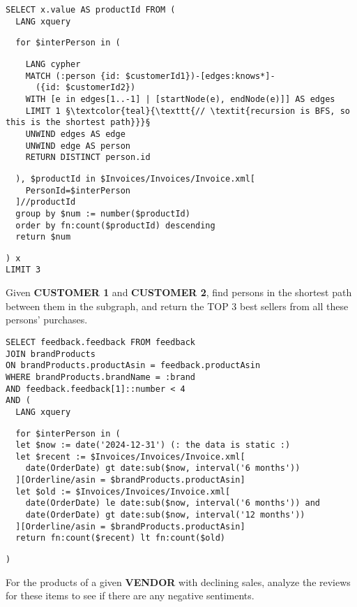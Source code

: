 \begin{listing}[!ht]
\begin{verbatim}
SELECT x.value AS productId FROM (
  LANG xquery
\end{verbatim}
\nestedMintedVspace
\begin{verbatim}
  for $interPerson in (
\end{verbatim}
\nestedMintedVspace
\begin{verbatim}
    LANG cypher
    MATCH (:person {id: $customerId1})-[edges:knows*]-
      ({id: $customerId2})
    WITH [e in edges[1..-1] | [startNode(e), endNode(e)]] AS edges
    LIMIT 1 §\textcolor{teal}{\texttt{// \textit{recursion is BFS, so this is the shortest path}}}§
    UNWIND edges AS edge
    UNWIND edge AS person
    RETURN DISTINCT person.id
\end{verbatim}
\nestedMintedVspace
\begin{verbatim}
  ), $productId in $Invoices/Invoices/Invoice.xml[
    PersonId=$interPerson
  ]//productId
  group by $num := number($productId)
  order by fn:count($productId) descending
  return $num
\end{verbatim}
\nestedMintedVspace
\begin{verbatim}
) x
LIMIT 3
\end{verbatim}
\caption{Given \textbf{CUSTOMER 1} and \textbf{CUSTOMER 2}, find persons in the shortest path between them in the subgraph, and return the TOP 3 best sellers from all these persons’ purchases.}
\end{listing}

\begin{listing}[!ht]
\begin{verbatim}
SELECT feedback.feedback FROM feedback
JOIN brandProducts
ON brandProducts.productAsin = feedback.productAsin
WHERE brandProducts.brandName = :brand
AND feedback.feedback[1]::number < 4
AND (
  LANG xquery
\end{verbatim}
\nestedMintedVspace
\begin{verbatim}
  for $interPerson in (
  let $now := date('2024-12-31') (: the data is static :)
  let $recent := $Invoices/Invoices/Invoice.xml[ 
    date(OrderDate) gt date:sub($now, interval('6 months'))
  ][Orderline/asin = $brandProducts.productAsin]
  let $old := $Invoices/Invoices/Invoice.xml[ 
    date(OrderDate) le date:sub($now, interval('6 months')) and
    date(OrderDate) gt date:sub($now, interval('12 months'))
  ][Orderline/asin = $brandProducts.productAsin]
  return fn:count($recent) lt fn:count($old)
\end{verbatim}
\nestedMintedVspace
\begin{verbatim}
)
\end{verbatim}
\caption{For the products of a given \textbf{VENDOR} with declining sales, analyze the reviews for these items to see if there are any negative sentiments.}
\end{listing}

